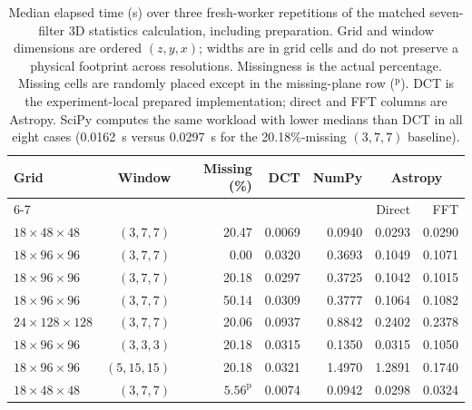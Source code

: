\documentclass[a4paper,fleqn]{cas-sc}
\begin{document}
\begin{table}[pos=hbp]
	\centering
	\caption{Median elapsed time (s) over three fresh-worker repetitions of the matched seven-filter 3D statistics calculation, including preparation. Grid and window dimensions are ordered $(z,y,x)$; widths are in grid cells and do not preserve a physical footprint across resolutions. Missingness is the actual percentage. Missing cells are randomly placed except in the missing-plane row (${}^{\mathrm{p}}$). DCT is the experiment-local prepared implementation; direct and FFT columns are Astropy. SciPy computes the same workload with lower medians than DCT in all eight cases (0.0162~s versus 0.0297~s for the 20.18\%-missing $(3,7,7)$ baseline).}
	\label{tab:performance_time}
	\setlength{\tabcolsep}{4pt}
	\begin{tabular*}{\linewidth}{@{\extracolsep{\fill}}lrrrrrr@{}}
		\toprule
		Grid & Window & Missing (\%) & DCT & NumPy & \multicolumn{2}{c}{Astropy} \\
		\cmidrule(l){6-7}
		 & & & & & Direct & FFT \\
		\midrule
		$18\times48\times48$ & $(3,7,7)$ & 20.47 & 0.0069 & 0.0940 & 0.0293 & 0.0290 \\
		$18\times96\times96$ & $(3,7,7)$ & 0.00 & 0.0320 & 0.3693 & 0.1049 & 0.1071 \\
		$18\times96\times96$ & $(3,7,7)$ & 20.18 & 0.0297 & 0.3725 & 0.1042 & 0.1015 \\
		$18\times96\times96$ & $(3,7,7)$ & 50.14 & 0.0309 & 0.3777 & 0.1064 & 0.1082 \\
		$24\times128\times128$ & $(3,7,7)$ & 20.06 & 0.0937 & 0.8842 & 0.2402 & 0.2378 \\
		$18\times96\times96$ & $(3,3,3)$ & 20.18 & 0.0315 & 0.1350 & 0.0315 & 0.1050 \\
		$18\times96\times96$ & $(5,15,15)$ & 20.18 & 0.0321 & 1.4970 & 1.2891 & 0.1740 \\
		$18\times48\times48$ & $(3,7,7)$ & $5.56^{\mathrm{p}}$ & 0.0074 & 0.0942 & 0.0298 & 0.0324 \\
		\bottomrule
	\end{tabular*}
\end{table}
\end{document}
